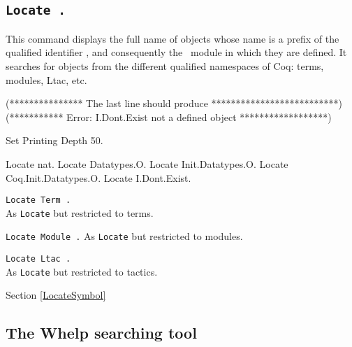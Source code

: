 
\subsection[\tt Locate {\qualid}.]{\tt Locate {\qualid}.
\label{Locate}}
This command displays the full name of objects whose name is a prefix of the
qualified identifier {\qualid}, and consequently the \Coq\ module in which they
are defined. It searches for objects from the different qualified namespaces of
Coq: terms, modules, Ltac, etc.

\begin{coq_eval}
(*************** The last line should produce **************************)
(*********** Error: I.Dont.Exist not a defined object ******************)
\end{coq_eval}
\begin{coq_eval}
Set Printing Depth 50.
\end{coq_eval}
\begin{coq_example}
Locate nat.
Locate Datatypes.O.
Locate Init.Datatypes.O.
Locate Coq.Init.Datatypes.O.
Locate I.Dont.Exist.
\end{coq_example}

\begin{Variants}
\item {\tt Locate Term {\qualid}.}\\
  As {\tt Locate} but restricted to terms.

\item {\tt Locate Module {\qualid}.}
  As {\tt Locate} but restricted to modules.

\item {\tt Locate Ltac {\qualid}.}\\
  As {\tt Locate} but restricted to tactics.
\end{Variants}


\SeeAlso Section \ref{LocateSymbol}

\subsection{The {\sc Whelp} searching tool
\label{Whelp}}

